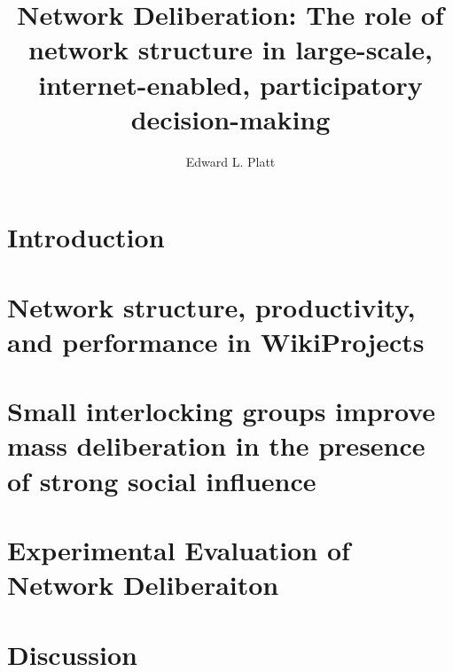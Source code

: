 \documentclass[thesis]{thesis-umich}
\title{Network Deliberation: The role of network structure in large-scale, internet-enabled, participatory decision-making}
\author{Edward L. Platt}
\begin{document}
\chapter{Introduction}
\label{chap:intro}


\chapter{Network structure, productivity, and performance in WikiProjects}
\label{chap:wp-prod-perf}


\chapter{Small interlocking groups improve mass deliberation in the presence
of strong social influence}
\label{chap:abm}


\chapter{Experimental Evaluation of Network Deliberaiton}
\label{chap:experiment}


\chapter{Discussion}
\label{chap:discussion}

%

\appendix
\label{apx:nk}





\end{document}
